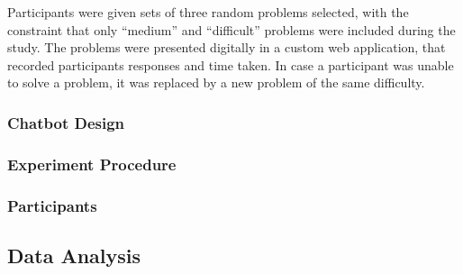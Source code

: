 Participants were given sets of three random problems selected, with the constraint that only “medium” and “difficult” problems were included during the study. The problems were presented digitally in a custom web application, that recorded participants responses and time taken. In case a participant was unable to solve a problem, it was replaced by a new problem of the same difficulty.

\subsubsection{Chatbot Design} \label{sssec:chatbot_design}


\subsubsection{Experiment Procedure} \label{sssec:experiment_procedure}


\subsubsection{Participants} \label{sssec:participants}


\subsection{Data Analysis} \label{ssec:data_analysis}
